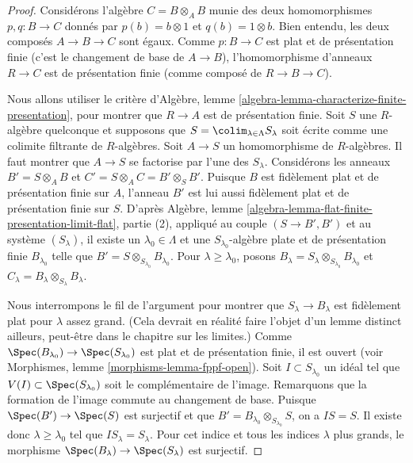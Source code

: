 \begin{proof}
Considérons l'algèbre $C = B \otimes_A B$ munie des deux homomorphismes
$p, q : B \to C$ donnés par $p(b) = b \otimes 1$ et $q(b) = 1 \otimes b$.
Bien entendu, les deux composés $A \to B \to C$ sont égaux.
Comme $p : B \to C$ est plat et de présentation finie (c'est le changement de
base de $A \to B$), l'homomorphisme d'anneaux $R \to C$ est de présentation
finie (comme composé de $R \to B \to C$).

\medskip\noindent
Nous allons utiliser le critère d'Algèbre, lemme
\ref{algebra-lemma-characterize-finite-presentation}, pour montrer que
$R \to A$ est de présentation finie.
Soit $S$ une $R$-algèbre quelconque et supposons que
$S = \colim_{\lambda \in \Lambda} S_\lambda$ soit écrite comme une colimite
filtrante de $R$-algèbres. Soit $A \to S$ un homomorphisme de $R$-algèbres.
Il faut montrer que $A \to S$ se factorise par l'une des $S_\lambda$.
Considérons les anneaux $B' = S \otimes_A B$ et
$C' = S \otimes_A C = B' \otimes_S B'$.
Puisque $B$ est fidèlement plat et de présentation finie sur $A$, l'anneau
$B'$ est lui aussi fidèlement plat et de présentation finie sur $S$.
D'après Algèbre, lemme
\ref{algebra-lemma-flat-finite-presentation-limit-flat}, partie (2), appliqué
au couple $(S \to B', B')$ et au système $(S_\lambda)$, il existe un
$\lambda_0 \in \Lambda$ et une $S_{\lambda_0}$-algèbre plate et de présentation
finie $B_{\lambda_0}$ telle que
$B' = S \otimes_{S_{\lambda_0}} B_{\lambda_0}$.
Pour $\lambda \geq \lambda_0$, posons
$B_\lambda = S_\lambda \otimes_{S_{\lambda_0}} B_{\lambda_0}$ et
$C_\lambda = B_\lambda \otimes_{S_\lambda} B_\lambda$.

\medskip\noindent
Nous interrompons le fil de l'argument pour montrer que
$S_\lambda \to B_\lambda$ est fidèlement plat pour $\lambda$ assez grand.
(Cela devrait en réalité faire l'objet d'un lemme distinct ailleurs, peut-être
dans le chapitre sur les limites.)
Comme $\Spec(B_{\lambda_0}) \to \Spec(S_{\lambda_0})$ est plat et de
présentation finie, il est ouvert (voir Morphismes, lemme
\ref{morphisms-lemma-fppf-open}).
Soit $I \subset S_{\lambda_0}$ un idéal tel que
$V(I) \subset \Spec(S_{\lambda_0})$ soit le complémentaire de l'image.
Remarquons que la formation de l'image commute au changement de base.
Puisque $\Spec(B') \to \Spec(S)$ est surjectif et que
$B' = B_{\lambda_0} \otimes_{S_{\lambda_0}} S$, on a $IS = S$.
Il existe donc $\lambda \geq \lambda_0$ tel que
$IS_{\lambda} = S_\lambda$. Pour cet indice et tous les indices
$\lambda$ plus grands, le morphisme
$\Spec(B_\lambda) \to \Spec(S_\lambda)$ est surjectif.


\end{proof}
